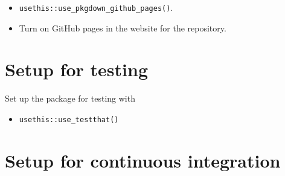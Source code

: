 \documentclass{article}
\begin{document}
%
\begin{itemize}

  \item \verb|usethis::use_pkgdown_github_pages()|.
  
  \item Turn on GitHub pages in the website for the repository.

\end{itemize}


\section{Setup for testing} 
\label{sec:testing_setup}

Set up the package for testing with

\begin{itemize}

  \item \verb|usethis::use_testthat()|

\end{itemize}


\section{Setup for continuous integration}
\label{sec:ci_setup}
\end{document}
